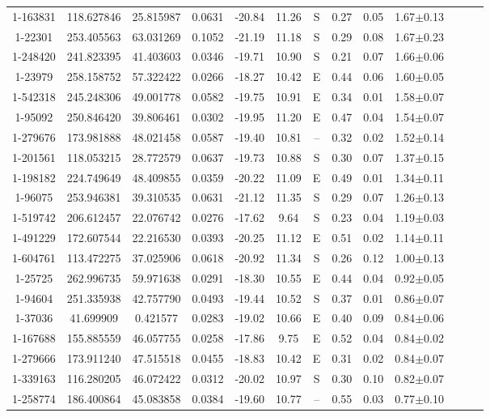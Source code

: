\begin{table*}
\begin{tabular}{ccccccccccccc}
1-163831 & 118.627846 & 25.815987 & 0.0631 & -20.84 & 11.26 & S & 0.27 & 0.05 & 1.67$\pm$0.13\\
1-22301 & 253.405563 & 63.031269 & 0.1052 & -21.19 & 11.18 & S & 0.29 & 0.08 & 1.67$\pm$0.23\\
1-248420 & 241.823395 & 41.403603 & 0.0346 & -19.71 & 10.90 & S & 0.21 & 0.07 & 1.66$\pm$0.06\\
1-23979 & 258.158752 & 57.322422 & 0.0266 & -18.27 & 10.42 & E & 0.44 & 0.06 & 1.60$\pm$0.05\\
1-542318 & 245.248306 & 49.001778 & 0.0582 & -19.75 & 10.91 & E & 0.34 & 0.01 & 1.58$\pm$0.07\\
1-95092 & 250.846420 & 39.806461 & 0.0302 & -19.95 & 11.20 & E & 0.47 & 0.04 & 1.54$\pm$0.07\\
1-279676 & 173.981888 & 48.021458 & 0.0587 & -19.40 & 10.81 & -- & 0.32 & 0.02 & 1.52$\pm$0.14\\
1-201561 & 118.053215 & 28.772579 & 0.0637 & -19.73 & 10.88 & S & 0.30 & 0.07 & 1.37$\pm$0.15\\
1-198182 & 224.749649 & 48.409855 & 0.0359 & -20.22 & 11.09 & E & 0.49 & 0.01 & 1.34$\pm$0.11\\
1-96075 & 253.946381 & 39.310535 & 0.0631 & -21.12 & 11.35 & S & 0.29 & 0.07 & 1.26$\pm$0.13\\
1-519742 & 206.612457 & 22.076742 & 0.0276 & -17.62 & 9.64 & S & 0.23 & 0.04 & 1.19$\pm$0.03\\
1-491229 & 172.607544 & 22.216530 & 0.0393 & -20.25 & 11.12 & E & 0.51 & 0.02 & 1.14$\pm$0.11\\
1-604761 & 113.472275 & 37.025906 & 0.0618 & -20.92 & 11.34 & S & 0.26 & 0.12 & 1.00$\pm$0.13\\
1-25725 & 262.996735 & 59.971638 & 0.0291 & -18.30 & 10.55 & E & 0.44 & 0.04 & 0.92$\pm$0.05\\
1-94604 & 251.335938 & 42.757790 & 0.0493 & -19.44 & 10.52 & S & 0.37 & 0.01 & 0.86$\pm$0.07\\
1-37036 & 41.699909 & 0.421577 & 0.0283 & -19.02 & 10.66 & E & 0.40 & 0.09 & 0.84$\pm$0.06\\
1-167688 & 155.885559 & 46.057755 & 0.0258 & -17.86 & 9.75 & E & 0.52 & 0.04 & 0.84$\pm$0.02\\
1-279666 & 173.911240 & 47.515518 & 0.0455 & -18.83 & 10.42 & E & 0.31 & 0.02 & 0.84$\pm$0.07\\
1-339163 & 116.280205 & 46.072422 & 0.0312 & -20.02 & 10.97 & S & 0.30 & 0.10 & 0.82$\pm$0.07\\
1-258774 & 186.400864 & 45.083858 & 0.0384 & -19.60 & 10.77 & -- & 0.55 & 0.03 & 0.77$\pm$0.10\\

\end{tabular}
\end{table*}
